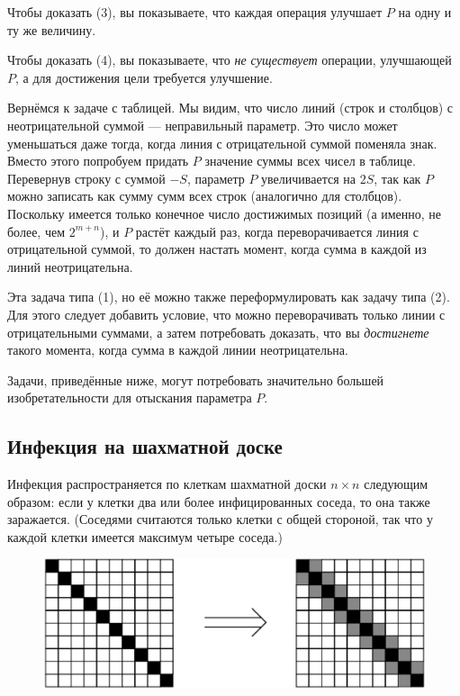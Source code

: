 Чтобы доказать (3), вы показываете, что каждая операция улучшает $P$ на одну и ту же величину.

Чтобы доказать (4), вы показываете, что \emph{не существует} операции, улучшающей $P$, а для достижения цели требуется улучшение.

\medskip

Вернёмся к задаче с таблицей.
Мы видим, что число линий (строк и столбцов) с неотрицательной суммой --- неправильный параметр.
Это число может уменьшаться даже тогда, когда линия с отрицательной суммой поменяла знак.
Вместо этого попробуем придать $P$ значение суммы всех чисел в таблице.
Перевернув строку с суммой $-S$, параметр $P$ увеличивается на $2S$, так как $P$ можно записать как сумму сумм всех строк (аналогично для столбцов).
Поскольку имеется только конечное число достижимых позиций
(а именно, не более, чем $2^{m+n}$), и $P$ растёт каждый раз, когда переворачивается линия с отрицательной суммой, то должен настать момент, когда сумма в каждой из линий неотрицательна.

Эта задача типа (1), но её можно также переформулировать как задачу типа (2).
Для этого следует добавить условие, что можно переворачивать только линии с отрицательными суммами, а затем потребовать доказать, что вы \emph{достигнете} такого момента, когда сумма в каждой линии неотрицательна.

\medskip

{
\sloppy

Задачи, приведённые ниже, могут потребовать значительно большей изобретательности для отыскания параметра $P$.

}

\subsection*{Инфекция на шахматной доске}%

Инфекция распространяется по клеткам шахматной доски $n \times n$ следующим образом: если у клетки два или более инфицированных соседа, то она также заражается.
(Соседями считаются только клетки с общей стороной, так что у каждой клетки имеется максимум четыре соседа.)

\begin{figure}[h!]
\centering
\includegraphics[scale=0.6]{Figs/Algorithms/diag}
\end{figure}

